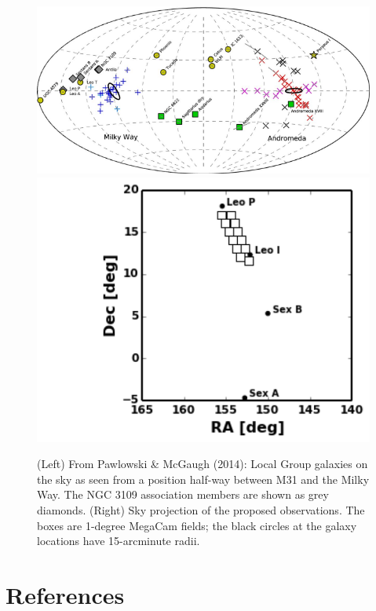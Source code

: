 \begin{figure}
\includegraphics[scale=0.9]{pm14_fig2}
\includegraphics[scale=0.6]{fields_leoi_new}
\caption{(Left)  From Pawlowski \& McGaugh (2014): Local Group galaxies on the sky as seen from a position half-way between M31 and the Milky Way.
The NGC 3109 association members are shown as grey diamonds.
(Right) Sky projection of the proposed observations. The boxes are 1-degree MegaCam fields; the black circles at the galaxy
locations have 15-arcminute radii. 
}
\end{figure}



\section*{References}

